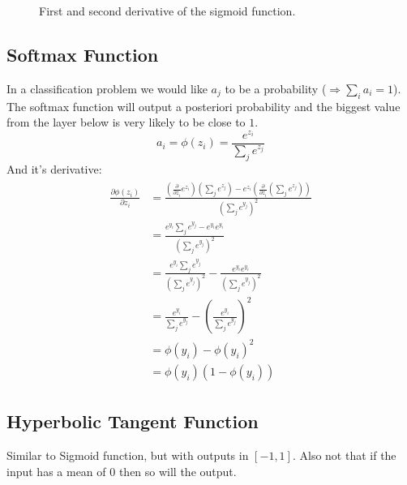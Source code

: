 \begin{figure}
\centering
{}
\caption{First and second derivative of the sigmoid function.}
\end{figure}

\subsection{Softmax Function}
In a classification problem we would like $a_j$ to be a probability ($\Rightarrow \sum_i a_i = 1$). The softmax function will output a posteriori probability and the biggest value from the layer below is very likely to be close to $1$.
\begin{equation}\label{ed:softmax}
a_i = \phi(z_i) = \frac{e^{z_i}}{\sum_j e^{z_j}}
\end{equation}
And it's derivative:
\begin{align}
\begin{split}\label{ed:softmax_derivative}
\frac{\partial \phi(z_i)}{\partial z_i}
&= \frac{\left(\frac{\partial}{\partial z_i} e^{z_i}\right)(\sum_j e^{z_j}) - e^{z_i} \left(\frac{\partial}{\partial z_i}(\sum_j e^{z_j})\right)}{(\sum_j e^{y_j})^2}\\
&= \frac{e^{y_i} \sum_j e^{y_j} - e^{y_i} e^{y_i}}{(\sum_j e^{y_j})^2}\\
&= \frac{e^{y_i} \sum_j e^{y_j}}{(\sum_j e^{y_j})^2} - \frac{e^{y_i} e^{y_i}}{(\sum_j e^{y_j})^2}\\
&= \frac{e^{y_i}}{\sum_j e^{y_j}} - \left(\frac{e^{y_i}}{\sum_j e^{y_j}}\right)^2\\
&= \phi(y_i) - \phi(y_i)^2\\
&= \phi(y_i) (1 - \phi(y_i))
\end{split}
\end{align}

\subsection{Hyperbolic Tangent Function}
Similar to Sigmoid function, but with outputs in $[-1,1]$. Also not that if the input has a mean of $0$ then so will the output.

